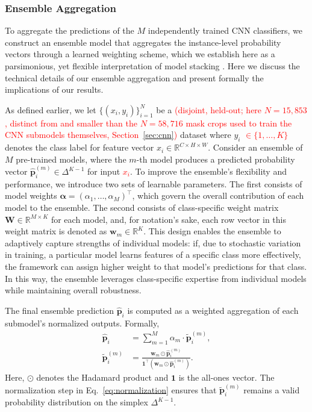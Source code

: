 \documentclass[11pt]{elsarticle}
\newcommand{\revadd}[1]{\textcolor{red}{#1}}
\newcommand{\revdel}[1]{%
  \sbox\revdelbox{#1}%
  \makebox[0pt][l]{\raisebox{0.45ex}{\rule{\wd\revdelbox}{0.4pt}}}\usebox\revdelbox
}
\begin{document}
\subsubsection{Ensemble Aggregation}
\label{sec:ensemble_aggregation}

To aggregate the predictions of the $M$ independently trained CNN classifiers, we construct an ensemble model that aggregates the instance-level probability vectors through a learned weighting scheme, which we establish here as a parsimonious, yet flexible interpretation of model stacking \citep{wolpert1992stacked, dietterich2000ensemble}. Here we discuss the technical details of our ensemble aggregation and present formally the implications of our results.

As defined earlier, we let \revdel{$\mathcal{D} = $}$\{(x_i, y_i)\}_{i=1}^N$ be a \revadd{(disjoint, held-out; here $N=15{,}853$, distinct from and smaller than the $N=58{,}716$ mask crops used to train the CNN submodels themselves, Section~\ref{sec:cnn})} dataset where $y_i$ \revdel{$\in {1, \dots, K}$}\revadd{$\in \{1, \ldots, K\}$} denotes the class label for feature vector $x_i\in\mathbb{R}^{C\times H\times W}$. Consider an ensemble of $M$ pre-trained models, where the $m$-th model produces a predicted probability vector $\hat{\bm{p}}^{(m)}_i \in \Delta^{K-1}$ for input \revdel{$\bm{x}_i$}\revadd{$x_i$}. To improve the ensemble's flexibility and performance, we introduce two sets of learnable parameters. The first consists of model weights $\bm{\alpha} = (\alpha_1, \dots, \alpha_M)^\intercal$, which govern the overall contribution of each model to the ensemble. The second consists of class-specific weight matrix $\bm{W} \in \mathbb{R}^{M\times K}$ for each model, and, for notation's sake, each row vector in this weight matrix is denoted as $\bm{w}_m \in \mathbb{R}^K$. This design enables the ensemble to adaptively capture strengths of individual models: if, due to stochastic variation in training, a particular model learns features of a specific class more effectively, the framework can assign higher weight to that model's predictions for that class. In this way, the ensemble leverages class-specific expertise from individual models while maintaining overall robustness.

The final ensemble prediction $\hat{\bm{p}}_i$ is computed as a weighted aggregation of each submodel's normalized outputs. Formally,
\begin{align}
\hat{\bm{p}}_i &= \sum_{m=1}^M \alpha_m \cdot \tilde{\bm{p}}^{(m)}_i,\label{eq:aggregation} \\
\tilde{\bm{p}}^{(m)}_i &= \frac{\bm{w}_m \odot \hat{\bm{p}}^{(m)}_i}{\bm{1}^\intercal \left(\bm{w}_m \odot \hat{\bm{p}}^{(m)}_i\right)}.
\label{eq:normalization}
\end{align}
Here, $\odot$ denotes the Hadamard product and $\bm{1}$ is the all-ones vector. The normalization step in Eq.~\ref{eq:normalization} ensures that $\tilde{\bm{p}}^{(m)}_i$ remains a valid probability distribution on the simplex $\Delta^{K-1}$.
\end{document}
